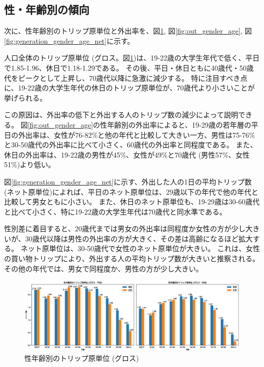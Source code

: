 \documentclass[a4paper,12pt, uplatex]{jsbook}
\begin{document}
\clearpage
\subsection{性・年齢別の傾向}
次に、性年齢別のトリップ原単位と外出率を、図\ref{fig:generation_gender_age}, 図\ref{fig:out_gender_age}, 図\ref{fig:generation_gender_age_net}に示す。

人口全体のトリップ原単位 (グロス。図\ref{fig:generation_gender_age})は、19-22歳の大学生年代で低く、平日で1.85-1.96、休日で1.18-1.29である。
その後、平日・休日ともに40歳代・50歳代をピークとして上昇し、70歳代以降に急激に減少する。
特に注目すべき点に、19-22歳の大学生年代の休日のトリップ原単位が、70歳代より小さいことが挙げられる。

この原因は、外出率の低下と外出する人のトリップ数の減少によって説明できる。
図\ref{fig:out_gender_age}の性年齢別の外出率によると、19-29歳の若年層の平日の外出率は、女性が76-82\%と他の年代と比較して大きい一方、男性は75-76\%と30-50歳代の外出率に比べて小さく、60歳代の外出率と同程度である。
また、休日の外出率は、19-22歳の男性が45\%、女性が49\%と70歳代 (男性57\%、女性51\%)より低い。

図\ref{fig:generation_gender_age_net}に示す、外出した人の1日の平均トリップ数 (ネット原単位)によれば、平日のネット原単位は、29歳以下の年代で他の年代と比較して男女ともに小さい。
また、休日のネット原単位も、19-29歳は30-60歳代と比べて小さく、特に19-22歳の大学生年代は70歳代と同水準である。

性別差に着目すると、20歳代までは男女の外出率は同程度か女性の方が少し大きいが、30歳代以降は男性の外出率の方が大きく、その差は高齢になるほど拡大する。
ネット原単位は、30-50歳代で女性のネット原単位が大きい。
これは、女性の買い物トリップにより、外出する人の平均トリップ数が大きいと推察される。
その他の年代では、男女で同程度か、男性の方が少し大きい。

\begin{figure}[htbp]
    \centering
    \includegraphics[width=1.0\textwidth]{picture/性年齢別のトリップ数.eps}
    \caption{性年齢別のトリップ原単位 (グロス)}
    \label{fig:generation_gender_age}
\end{figure}
\end{document}
